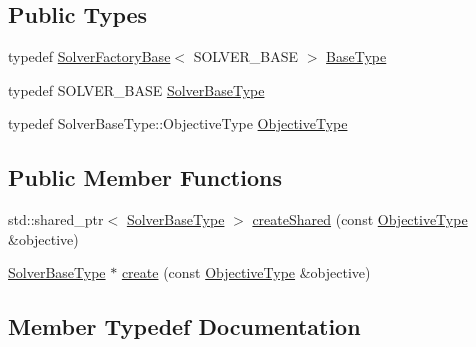 \subsection*{Public Types}
\begin{DoxyCompactItemize}
\item 
typedef \hyperlink{classnifty_1_1graph_1_1optimization_1_1common_1_1SolverFactoryBase}{Solver\+Factory\+Base}$<$ S\+O\+L\+V\+E\+R\+\_\+\+B\+A\+S\+E $>$ \hyperlink{classnifty_1_1graph_1_1optimization_1_1common_1_1PySolverFactoryBase_a717ac75e0f3ceea674f074249978d220}{Base\+Type}
\item 
typedef S\+O\+L\+V\+E\+R\+\_\+\+B\+A\+S\+E \hyperlink{classnifty_1_1graph_1_1optimization_1_1common_1_1PySolverFactoryBase_a12cb76fcc3bb2ae16dd1a4a4da891982}{Solver\+Base\+Type}
\item 
typedef Solver\+Base\+Type\+::\+Objective\+Type \hyperlink{classnifty_1_1graph_1_1optimization_1_1common_1_1PySolverFactoryBase_a79420d727e2e034fe10ee8a0736f7593}{Objective\+Type}
\end{DoxyCompactItemize}
\subsection*{Public Member Functions}
\begin{DoxyCompactItemize}
\item 
std\+::shared\+\_\+ptr$<$ \hyperlink{classnifty_1_1graph_1_1optimization_1_1common_1_1SolverFactoryBase_a32303ac07d31050bd56939ba09332a8c}{Solver\+Base\+Type} $>$ \hyperlink{classnifty_1_1graph_1_1optimization_1_1common_1_1PySolverFactoryBase_a737b0611c65673f2791dc764f6a9088c}{create\+Shared} (const \hyperlink{classnifty_1_1graph_1_1optimization_1_1common_1_1SolverFactoryBase_addf5fe831de3b6d9e3473eee67490a5c}{Objective\+Type} \&objective)
\item 
\hyperlink{classnifty_1_1graph_1_1optimization_1_1common_1_1SolverFactoryBase_a32303ac07d31050bd56939ba09332a8c}{Solver\+Base\+Type} $\ast$ \hyperlink{classnifty_1_1graph_1_1optimization_1_1common_1_1PySolverFactoryBase_a2e409e2315c71e286e03d27f6004782b}{create} (const \hyperlink{classnifty_1_1graph_1_1optimization_1_1common_1_1SolverFactoryBase_addf5fe831de3b6d9e3473eee67490a5c}{Objective\+Type} \&objective)
\end{DoxyCompactItemize}


\subsection{Member Typedef Documentation}
\hypertarget{classnifty_1_1graph_1_1optimization_1_1common_1_1PySolverFactoryBase_a717ac75e0f3ceea674f074249978d220}{}
